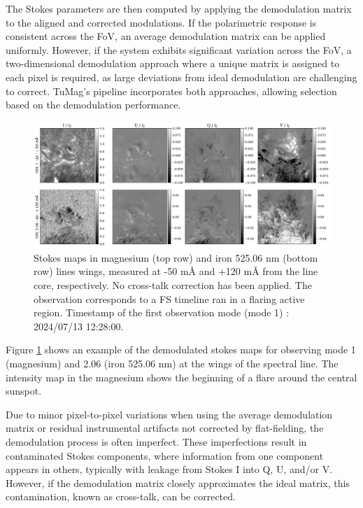 The Stokes parameters are then computed by applying the demodulation matrix to the aligned and corrected modulations. If the polarimetric response is consistent across the FoV, an average demodulation matrix can be applied uniformly. However, if the system exhibits significant variation across the FoV, a two-dimensional demodulation approach where a unique matrix is assigned to each pixel is required, as large deviations from ideal demodulation are challenging to correct. TuMag's pipeline incorporates both approaches, allowing selection based on the demodulation performance. 

\begin{figure}
  \includegraphics[width=\textwidth]{figures/Pipeline/Example_demodulation.pdf}
  \caption[Stokes maps for magnesium and iron.]{Stokes maps in magnesium (top row) and iron 525.06 nm (bottom row) lines wings, measured at -50 m\r{A} and +120 m\r{A} from the line core, respectively. No cross-talk correction has been applied. The observation corresponds to a FS timeline ran in a flaring active region. Timestamp of the first observation mode (mode 1) : 2024/07/13 12:28:00.  }
    \label{fig_pipeline: demodulated_data}
\end{figure}

Figure \ref{fig_pipeline: demodulated_data} shows an example of the demodulated stokes maps for observing mode 1 (magnesium) and 2.06 (iron 525.06 nm) at the wings of the spectral line. The intensity map in the magnesium shows the beginning of a flare around the central sunspot. 

Due to minor pixel-to-pixel variations when using the average demodulation matrix or residual instrumental artifacts not corrected by flat-fielding, the demodulation process is often imperfect. These imperfections result in contaminated Stokes components, where information from one component appears in others, typically with leakage from Stokes I into Q, U, and/or V. However, if the demodulation matrix closely approximates the ideal matrix, this contamination, known as cross-talk, can be corrected.

